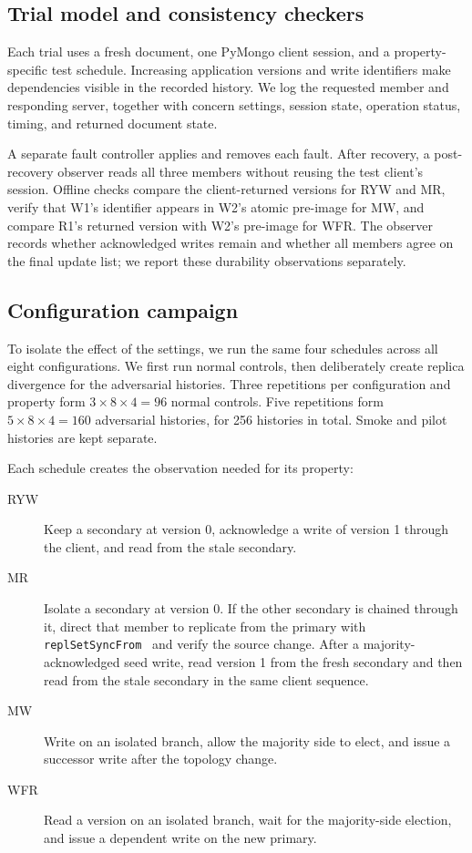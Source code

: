 \subsection{Trial model and consistency checkers}

Each trial uses a fresh document, one PyMongo client session, and a
property-specific test schedule. Increasing application versions and write
identifiers make dependencies visible in the recorded history. We log the
requested member and responding server, together with concern settings,
session state, operation status, timing, and returned document state.

A separate fault controller applies and removes each fault. After recovery, a
post-recovery observer reads all three members without reusing the test
client's session. Offline checks compare the client-returned versions for RYW
and MR, verify that W1's identifier appears in W2's atomic pre-image for MW,
and compare R1's returned version with W2's pre-image for WFR. The observer
records whether acknowledged writes remain and whether all members agree on
the final update list; we report these durability observations separately.

\subsection{Configuration campaign}

To isolate the effect of the settings, we run the same four schedules across
all eight configurations. We first run normal controls, then deliberately
create replica divergence for the adversarial histories. Three repetitions
per configuration and property form
\(3\times8\times4=96\) normal controls. Five repetitions form
\(5\times8\times4=160\) adversarial histories, for 256 histories in total.
Smoke and pilot histories are kept separate.

Each schedule creates the observation needed for its property:

\begin{description}
\item[RYW] Keep a secondary at version 0, acknowledge a write of version 1
through the client, and read from the stale secondary.
\item[MR] Isolate a secondary at version 0. If the other secondary is chained
through it, direct that member to replicate from the primary with
\texttt{replSetSyncFrom}~\cite{mongodb-replset-syncfrom} and verify the source
change. After a majority-acknowledged seed write, read version 1 from the fresh
secondary and then read from the stale secondary in the same client sequence.
\item[MW] Write on an isolated branch, allow the majority side to elect, and
issue a successor write after the topology change.
\item[WFR] Read a version on an isolated branch, wait for the majority-side
election, and issue a dependent write on the new primary.
\end{description}

